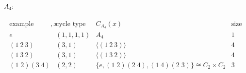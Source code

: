 \emph{$A_4$}:

\begin{align*}
    \begin{array}{cccc}
        \text{example member}, x & \text{cycle type} & C_{A_4}(x) & \text{size of cong class} \\
        e & (1, 1, 1, 1) & A_4 & 1 \\
        (1\ 2\ 3) & (3, 1) & \langle (1\ 2\ 3) \rangle & 4\\
        (1\ 3\ 2) & (3, 1) & \langle (1\ 3\ 2) \rangle & 4 \\
        (1\; 2)(3\; 4) & (2, 2) & \{e, (1\; 2)(2\; 4), (1\; 4)(2\; 3) \} \cong C_2 \times C_2 & 3
    \end{array}  
\end{align*} 